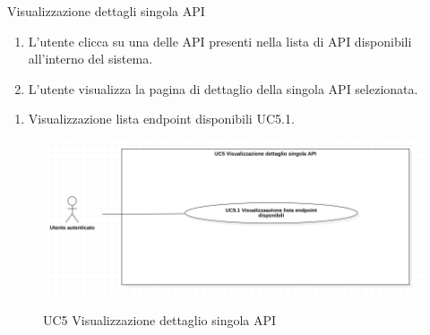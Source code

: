\begin{usecase}{5}{Visualizzazione dettagli singola API}\label{uc:visualizzazione-dettagli-singola-api}

    \usecasemain{}
        \begin{enumerate}
            \item L'utente clicca su una delle API presenti nella lista di API disponibili all'interno del sistema.
            \item L'utente visualizza la pagina di dettaglio della singola API selezionata.
        \end{enumerate}

        \begin{enumerate}
            \item Visualizzazione lista endpoint disponibili UC5.1.
        \end{enumerate}

\end{usecase}

\begin{figure}[!ht] 
    \centering 
    \includegraphics[width=0.85\columnwidth, alt={Caso d'uso relativo alla visualizzazione del dettaglio di una singola API}]{images/usecase/UC5.jpg}
    \caption{UC5 Visualizzazione dettaglio singola API}\label{fig:uc:visualizzazione-dettaglio-singola-api}
  \end{figure}


